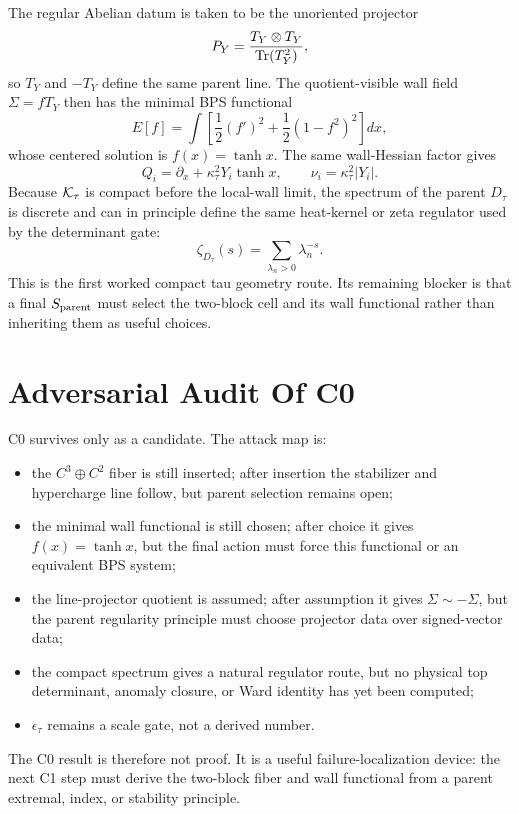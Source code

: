 \documentclass[11pt]{article}
\begin{document}
The regular Abelian datum is taken to be the unoriented projector
\begin{equation}
P_Y=\frac{T_Y\otimes T_Y}{{\rm Tr}(T_Y^2)} ,
\end{equation}
so $T_Y$ and $-T_Y$ define the same parent line.  The quotient-visible wall
field $\Sigma=fT_Y$ then has the minimal BPS functional
\begin{equation}
E[f]=\int\left[\frac12(f')^2+\frac12(1-f^2)^2\right]dx,
\end{equation}
whose centered solution is $f(x)=\tanh x$.  The same wall-Hessian factor gives
\begin{equation}
Q_i=\partial_x+\kappa_\tau^2Y_i\tanh x,
\qquad
\nu_i=\kappa_\tau^2|Y_i|.
\end{equation}
Because ${\cal K}_\tau$ is compact before the local-wall limit, the spectrum
of the parent $D_\tau$ is discrete and can in principle define the same
heat-kernel or zeta regulator used by the determinant gate:
\begin{equation}
\zeta_{D_\tau}(s)=\sum_{\lambda_n>0}\lambda_n^{-s}.
\end{equation}
This is the first worked compact tau geometry route.  Its remaining blocker is
that a final $S_{\rm parent}$ must select the two-block cell and its wall
functional rather than inheriting them as useful choices.

\section{Adversarial Audit Of C0}
C0 survives only as a candidate.  The attack map is:
\begin{itemize}
\item the $C^3\oplus C^2$ fiber is still inserted; after insertion the
stabilizer and hypercharge line follow, but parent selection remains open;
\item the minimal wall functional is still chosen; after choice it gives
$f(x)=\tanh x$, but the final action must force this functional or an
equivalent BPS system;
\item the line-projector quotient is assumed; after assumption it gives
$\Sigma\sim-\Sigma$, but the parent regularity principle must choose projector
data over signed-vector data;
\item the compact spectrum gives a natural regulator route, but no physical
top determinant, anomaly closure, or Ward identity has yet been computed;
\item $\epsilon_\tau$ remains a scale gate, not a derived number.
\end{itemize}
The C0 result is therefore not proof.  It is a useful failure-localization
device: the next C1 step must derive the two-block fiber and wall functional
from a parent extremal, index, or stability principle.
\end{document}
